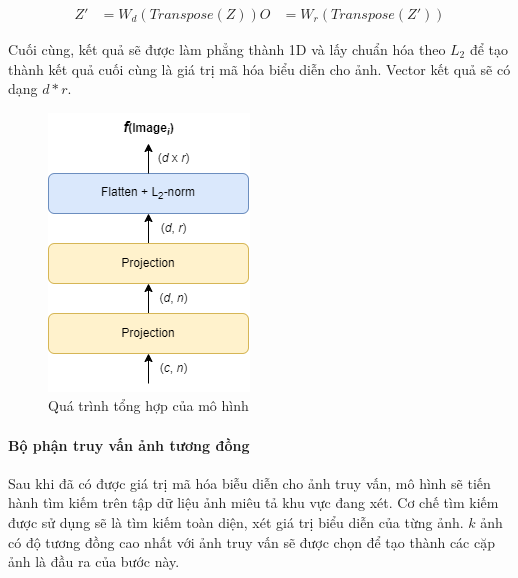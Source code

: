 $$
\begin{aligned}
Z' &= W_d(Transpose(Z))
O &= W_r(Transpose(Z'))
\end{aligned}
$$

Cuối cùng, kết quả sẽ được làm phẳng thành 1D và lấy chuẩn hóa theo $L_2$ để tạo thành kết quả cuối cùng là giá trị mã hóa biểu diễn cho ảnh. Vector kết quả sẽ có dạng $d*r$.

\begin{figure}[H]
    \centering
    \includegraphics[scale=0.6]{pics/Proposal/proj-agg.png}
    \caption{Quá trình tổng hợp của mô hình \cite{alibey2023mixvpr}}
\end{figure}

\paragraph*{Bộ phận truy vấn ảnh tương đồng}

Sau khi đã có được giá trị mã hóa biễu diễn cho ảnh truy vấn, mô hình sẽ tiến hành tìm kiếm trên tập dữ liệu ảnh miêu tả khu vực đang xét. Cơ chế tìm kiếm được sử dụng sẽ là tìm kiếm toàn diện, xét giá trị biểu diễn của từng ảnh. $k$ ảnh có độ tương đồng cao nhất với ảnh truy vấn sẽ được chọn để tạo thành các cặp ảnh là đầu ra của bước này.

